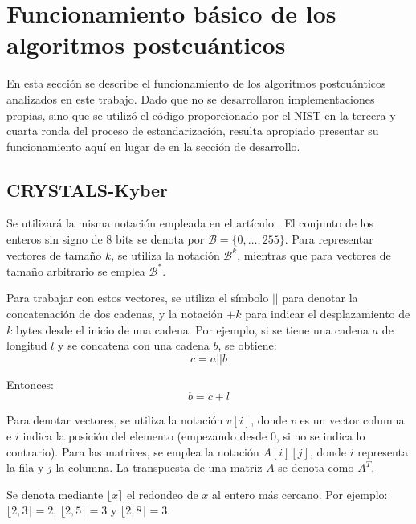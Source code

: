 \section{Funcionamiento básico de los algoritmos postcuánticos}
En esta sección se describe el funcionamiento de los algoritmos postcuánticos analizados en este trabajo. Dado que no se desarrollaron implementaciones propias, sino que se utilizó el código proporcionado por el NIST en la tercera \cite{nistPQCround3} y cuarta \cite{nistPQCround4} ronda del proceso de estandarización, resulta apropiado presentar su funcionamiento aquí en lugar de en la sección de desarrollo.
\subsection{CRYSTALS-Kyber }
Se utilizará la misma notación empleada en el artículo \cite{kyber-spec-2021}. El conjunto de los enteros sin signo de 8 bits se denota por \(\mathcal{B} = \{0, \dots, 255\}\). Para representar vectores de tamaño \(k\), se utiliza la notación \(\mathcal{B}^k\), mientras que para vectores de tamaño arbitrario se emplea \(\mathcal{B}^*\).
\newline

Para trabajar con estos vectores, se utiliza el símbolo \(||\) para denotar la concatenación de dos cadenas, y la notación \(+k\) para indicar el desplazamiento de \(k\) bytes desde el inicio de una cadena. Por ejemplo, si se tiene una cadena \(a\) de longitud \(l\) y se concatena con una cadena \(b\), se obtiene:
\begin{equation}
	c = a || b
\end{equation}

Entonces:
\begin{equation}
	b = c + l
\end{equation}

Para denotar vectores, se utiliza la notación \(v[i]\), donde \(v\) es un vector columna e \(i\) indica la posición del elemento (empezando desde 0, si no se indica lo contrario). Para las matrices, se emplea la notación \(A[i][j]\), donde \(i\) representa la fila y \(j\) la columna. La transpuesta de una matriz \(A\) se denota como \(A^T\).
\newline

Se denota mediante \(\lfloor x \rceil\) el redondeo de \(x\) al entero más cercano. Por ejemplo: \(\lfloor 2{,}3 \rceil = 2\), \(\lfloor 2{,}5 \rceil = 3\) y \(\lfloor 2{,}8 \rceil = 3\).
\newline

